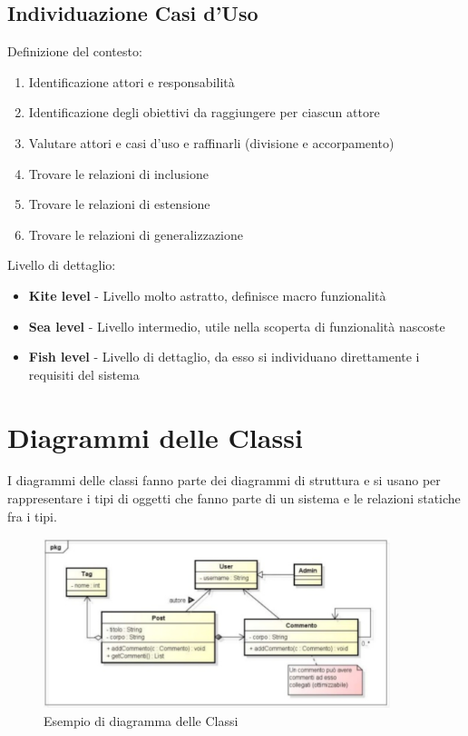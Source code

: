 \subsection{Individuazione Casi d'Uso}

Definizione del contesto:
\begin{enumerate}
\item Identificazione attori e responsabilità
\item Identificazione degli obiettivi da raggiungere per ciascun attore
\item Valutare attori e casi d'uso e raffinarli (divisione e accorpamento)
\item Trovare le relazioni di inclusione
\item Trovare le relazioni di estensione
\item Trovare le relazioni di generalizzazione
\end{enumerate}
Livello di dettaglio:
\begin{itemize}
\item \textbf{Kite level} - Livello molto astratto, definisce macro funzionalità
\item \textbf{Sea level} - Livello intermedio, utile nella scoperta di funzionalità nascoste
\item \textbf{Fish level} - Livello di dettaglio, da esso si individuano direttamente i requisiti del sistema
\end{itemize}

\section{Diagrammi delle Classi}
I diagrammi delle classi fanno parte dei diagrammi di struttura e si usano per rappresentare i tipi di oggetti che fanno parte di un sistema e le relazioni statiche fra i tipi. 

\begin{figure}[H]
\centering
    \includegraphics[width=0.9\textwidth]{res/img/esempioDiagrammaClassi}
    \caption{Esempio di diagramma delle Classi}
\end{figure}

